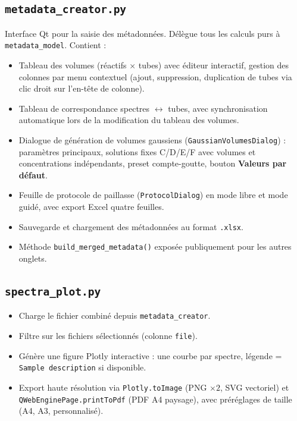 \documentclass[12pt, a4paper]{article}
\begin{document}
\subsection{\texttt{metadata\_creator.py}}

Interface Qt pour la saisie des métadonnées. Délègue tous les calculs purs
à \texttt{metadata\_model}. Contient :

\begin{itemize}
  \item Tableau des volumes (réactifs $\times$ tubes) avec éditeur interactif,
        gestion des colonnes par menu contextuel (ajout, suppression,
        duplication de tubes via clic droit sur l'en-tête de colonne).
  \item Tableau de correspondance spectres $\leftrightarrow$ tubes, avec
        synchronisation automatique lors de la modification du tableau des
        volumes.
  \item Dialogue de génération de volumes gaussiens
        (\texttt{GaussianVolumesDialog}) : paramètres principaux, solutions
        fixes C/D/E/F avec volumes et concentrations indépendants, preset
        compte-goutte, bouton \textbf{Valeurs par défaut}.
  \item Feuille de protocole de paillasse (\texttt{ProtocolDialog}) en mode
        libre et mode guidé, avec export Excel quatre feuilles.
  \item Sauvegarde et chargement des métadonnées au format \texttt{.xlsx}.
  \item Méthode \texttt{build\_merged\_metadata()} exposée publiquement pour
        les autres onglets.
\end{itemize}

\subsection{\texttt{spectra\_plot.py}}

\begin{itemize}
  \item Charge le fichier combiné depuis \texttt{metadata\_creator}.
  \item Filtre sur les fichiers sélectionnés (colonne \texttt{file}).
  \item Génère une figure Plotly interactive : une courbe par spectre,
        légende = \texttt{Sample description} si disponible.
  \item Export haute résolution via \texttt{Plotly.toImage} (PNG $\times 2$,
        SVG vectoriel) et \texttt{QWebEnginePage.printToPdf} (PDF A4
        paysage), avec préréglages de taille (A4, A3, personnalisé).
\end{itemize}
\end{document}
